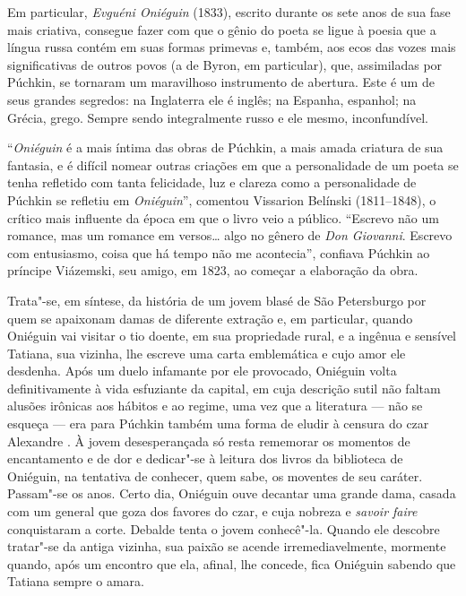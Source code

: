 Em particular, \emph{Evguéni Oniéguin} (1833), escrito durante os
sete anos de sua fase mais criativa, consegue fazer com que o gênio do poeta se ligue à poesia
que a língua russa contém em suas formas primevas e, também, aos ecos das
vozes mais significativas de outros povos (a de Byron, em particular),
que, assimiladas por Púchkin, se tornaram um maravilhoso instrumento de
abertura. Este é um de seus grandes segredos: na Inglaterra ele é
inglês; na Espanha, espanhol; na Grécia, grego. Sempre sendo
integralmente russo e ele mesmo, inconfundível.

``\emph{Oniéguin} é a mais íntima das obras de Púchkin, a mais amada criatura de
sua fantasia, e é difícil nomear outras criações em que a personalidade
de um poeta se tenha refletido com tanta felicidade, luz e clareza como
a personalidade de Púchkin se refletiu em \emph{Oniéguin}'', comentou Vissarion
Belínski (1811--1848), o crítico mais influente da época em que o livro veio a
público. ``Escrevo não um romance, mas um romance em versos\ldots{} algo no
gênero de \emph{Don Giovanni}. Escrevo com entusiasmo, coisa que há tempo não
me acontecia'', confiava Púchkin ao príncipe Viázemski, seu amigo, em
1823, ao começar a elaboração da obra.

Trata"-se, em síntese, da história de um jovem blasé de São Petersburgo
por quem se apaixonam damas de diferente extração e, em particular,
quando Oniéguin vai visitar o tio doente, em sua propriedade rural, e a
ingênua e sensível Tatiana, sua vizinha, lhe escreve uma carta
emblemática e cujo amor ele desdenha. Após um duelo infamante por ele
provocado, Oniéguin volta definitivamente à vida esfuziante da capital,
em cuja descrição sutil não faltam alusões irônicas aos hábitos e ao
regime, uma vez que a literatura --- não se esqueça --- era para Púchkin
também uma forma de eludir à censura do czar Alexandre . À jovem
desesperançada só resta rememorar os momentos de encantamento e de dor e
dedicar"-se à leitura dos livros da biblioteca de Oniéguin, na tentativa
de conhecer, quem sabe, os moventes de seu caráter. Passam"-se os anos.
Certo dia, Oniéguin ouve decantar uma grande dama, casada com um general
que goza dos favores do czar, e cuja nobreza e \emph{savoir faire} conquistaram
a corte. Debalde tenta o jovem conhecê"-la. Quando ele descobre tratar"-se
da antiga vizinha, sua paixão se acende irremediavelmente, mormente
quando, após um encontro que ela, afinal, lhe concede, fica Oniéguin
sabendo que Tatiana sempre o amara.

